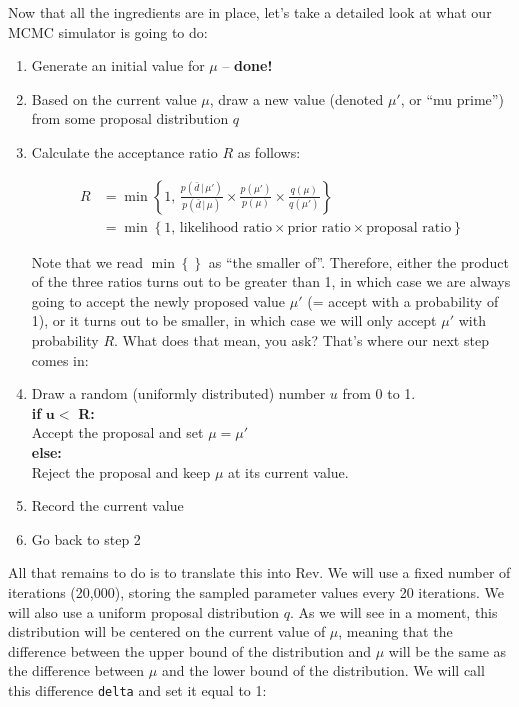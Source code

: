 \documentclass[12pt]{article}
\begin{document}
\noindent Now that all the ingredients are in place, let's take a detailed look at what our MCMC simulator is going to do:

\begin{enumerate}
  \item Generate an initial value for $\mu$ -- \textbf{done!}
  \item Based on the current value $\mu$, draw a new value (denoted $\mu'$, or ``mu prime'') from some proposal distribution $q$
  \item Calculate the acceptance ratio $R$ as follows:
  
  \begin{align*}
  R &= \min\left\{1, \, \frac{p(\bar{d} \, | \, \mu')}{p(\bar{d} \, | \, \mu)} \times \frac{p(\mu')}{p(\mu)} \times \frac{q(\mu)}{q(\mu')} \right\} \\[1ex]
      &= \min\left\{1, \, \text{likelihood ratio} \times \text{prior ratio} \times \text{proposal ratio} \right\}
  \end{align*}
  
  Note that we read $\min\left\{\right\}$ as ``the smaller of''. Therefore, either the product of the three ratios turns out to be greater than 1, in which case we are always going to accept the newly proposed value $\mu'$ (= accept with a probability of 1), or it turns out to be smaller, in which case we will only accept $\mu'$ with probability $R$. What does that mean, you ask? That's where our next step comes in:
  \item Draw a random (uniformly distributed) number $u$ from 0 to 1. \\[1ex]
  \textbf{if} $\boldsymbol{u <}$ \textbf{R:} \\
  \hspace*{20pt} Accept the proposal and set $\mu = \mu'$ \\
  \textbf{else:} \\
  \hspace*{20pt} Reject the proposal and keep $\mu$ at its current value.
  \item Record the current value
  \item Go back to step 2
\end{enumerate}

\newpage

\noindent All that remains to do is to translate this into Rev. We will use a fixed number of iterations (20,000), storing the sampled parameter values every 20 iterations. We will also use a uniform proposal distribution $q$. As we will see in a moment, this distribution will be centered on the current value of $\mu$, meaning that the difference between the upper bound of the distribution and $\mu$ will be the same as the difference between $\mu$ and the lower bound of the distribution. We will call this difference \texttt{delta} and set it equal to 1: \\
\end{document}
